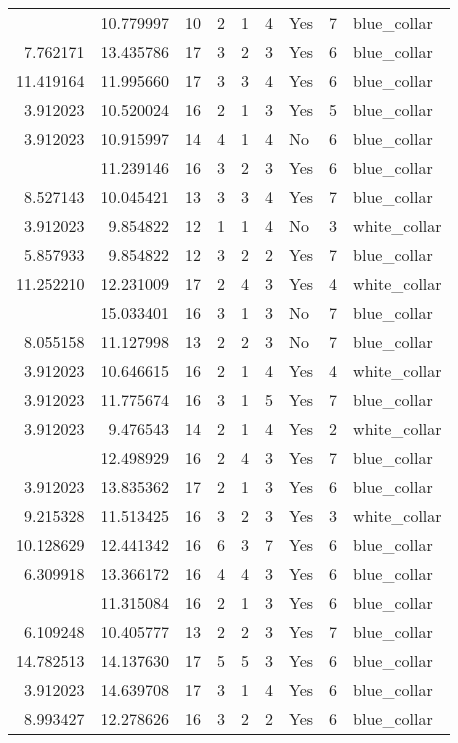 \documentclass[
]{article}
\begin{document}
\begin{longtable}[t]{rrrrrllrl}
\addlinespace
3.912023 & 10.779997 & 10 & 2 & 1 & 4 & Yes & 7 & blue\_collar\\
7.762171 & 13.435786 & 17 & 3 & 2 & 3 & Yes & 6 & blue\_collar\\
11.419164 & 11.995660 & 17 & 3 & 3 & 4 & Yes & 6 & blue\_collar\\
3.912023 & 10.520024 & 16 & 2 & 1 & 3 & Yes & 5 & blue\_collar\\
3.912023 & 10.915997 & 14 & 4 & 1 & 4 & No & 6 & blue\_collar\\
\addlinespace
10.915997 & 11.239146 & 16 & 3 & 2 & 3 & Yes & 6 & blue\_collar\\
8.527143 & 10.045421 & 13 & 3 & 3 & 4 & Yes & 7 & blue\_collar\\
3.912023 & 9.854822 & 12 & 1 & 1 & 4 & No & 3 & white\_collar\\
5.857933 & 9.854822 & 12 & 3 & 2 & 2 & Yes & 7 & blue\_collar\\
11.252210 & 12.231009 & 17 & 2 & 4 & 3 & Yes & 4 & white\_collar\\
\addlinespace
3.912023 & 15.033401 & 16 & 3 & 1 & 3 & No & 7 & blue\_collar\\
8.055158 & 11.127998 & 13 & 2 & 2 & 3 & No & 7 & blue\_collar\\
3.912023 & 10.646615 & 16 & 2 & 1 & 4 & Yes & 4 & white\_collar\\
3.912023 & 11.775674 & 16 & 3 & 1 & 5 & Yes & 7 & blue\_collar\\
3.912023 & 9.476543 & 14 & 2 & 1 & 4 & Yes & 2 & white\_collar\\
\addlinespace
11.918724 & 12.498929 & 16 & 2 & 4 & 3 & Yes & 7 & blue\_collar\\
3.912023 & 13.835362 & 17 & 2 & 1 & 3 & Yes & 6 & blue\_collar\\
9.215328 & 11.513425 & 16 & 3 & 2 & 3 & Yes & 3 & white\_collar\\
10.128629 & 12.441342 & 16 & 6 & 3 & 7 & Yes & 6 & blue\_collar\\
6.309918 & 13.366172 & 16 & 4 & 4 & 3 & Yes & 6 & blue\_collar\\
\addlinespace
3.912023 & 11.315084 & 16 & 2 & 1 & 3 & Yes & 6 & blue\_collar\\
6.109248 & 10.405777 & 13 & 2 & 2 & 3 & Yes & 7 & blue\_collar\\
14.782513 & 14.137630 & 17 & 5 & 5 & 3 & Yes & 6 & blue\_collar\\
3.912023 & 14.639708 & 17 & 3 & 1 & 4 & Yes & 6 & blue\_collar\\
8.993427 & 12.278626 & 16 & 3 & 2 & 2 & Yes & 6 & blue\_collar\\

\end{longtable}
\end{document}
